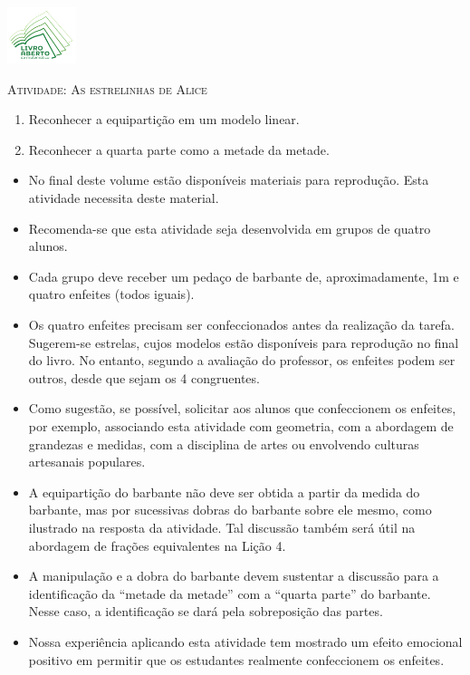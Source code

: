\documentclass[10 pt,usenames,dvipsnames, oneside]{article}
\begin{document}
\begin{center}
  \begin{minipage}[l]{3cm}
\includegraphics[width=2cm]{logo}    
\end{minipage}\hfill
\begin{minipage}[r]{.8\textwidth}
 {\Large \scshape Atividade: As estrelinhas de Alice}  
\end{minipage}
\end{center}
\vspace{.2cm}

\ifdefined\prof
\begin{goals}
\begin{enumerate}
    \item       Reconhecer a equipartição em um modelo linear.
    \item       Reconhecer a quarta parte como a metade da metade.
\end{enumerate}
\tcblower
\begin{itemize} %
   \item No final deste volume estão disponíveis materiais para reprodução. Esta atividade necessita deste material.
   \item Recomenda-se que esta atividade seja desenvolvida em grupos de quatro alunos.
   \item       Cada grupo deve receber um pedaço de barbante de, aproximadamente, 1m e quatro enfeites (todos iguais).
    \item       Os quatro enfeites precisam ser confeccionados antes da realização da tarefa. Sugerem-se estrelas, cujos modelos estão disponíveis para reprodução no final do livro. No entanto, segundo a avaliação do professor, os enfeites podem ser outros, desde que sejam os 4 congruentes.
    \item       Como sugestão, se possível, solicitar aos alunos que confeccionem os enfeites, por exemplo, associando esta atividade com geometria, com a abordagem de grandezas e medidas, com a disciplina de artes ou envolvendo culturas artesanais populares.
    \item       A equipartição do barbante não deve ser obtida a partir da medida do barbante, mas por sucessivas dobras do barbante sobre ele mesmo, como ilustrado na resposta da atividade. Tal discussão também  será útil na abordagem de frações equivalentes na Lição 4.
    \item       A manipulação e a dobra do barbante devem sustentar a discussão para a identificação da       ``metade da metade'' com a       ``quarta parte'' do barbante. Nesse caso, a identificação se dará pela sobreposição das partes.
      \item Nossa experiência aplicando esta atividade tem mostrado um efeito emocional positivo em permitir que os estudantes realmente confeccionem os enfeites.
\end{itemize} %

\end{goals}
\end{document}
